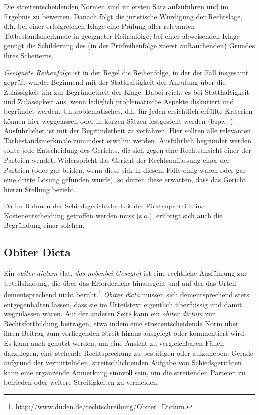 Die streitentscheidenden Normen sind im ersten Satz aufzuführen und im Ergebnis zu bewerten.%
Danach folgt die juristische Würdigung der Rechtslage, d.h. bei einer erfolgreichen Klage eine Prüfung aller relevanten Tatbestandsmerkmale in geeigneter Reihenfolge; bei einer abweisenden Klage genügt die Schilderung des (in der Prüfreihenfolge zuerst auftauchenden) Grundes ihres Scheiterns.

\emph{Geeignete Reihenfolge} ist in der Regel die Reihenfolge, in der der Fall insgesamt geprüft wurde:
Beginnend mit der Statthaftigkeit der Anrufung über die Zulässigkeit hin zur Begründetheit der Klage.
Dabei reicht es bei Statthaftigkeit und Zulässigkeit aus, wenn lediglich problematische Aspekte diskutiert und begründet werden.
Unproblematisches, d.h. für jeden ersichtlich erfüllte Kriterien können hier weggelassen oder in kurzen Sätzen festgestellt werden (bspw. ).
Ausführlicher ist mit der Begründetheit zu verfahren:
Hier sollten alle relevanten Tatbestandsmerkmale zumindest erwähnt werden.
Ausführlich begründet werden sollte jede Entscheidung des Gerichts, die sich gegen eine Rechtsansicht einer der Parteien wendet:
Widerspricht das Gericht der Rechtsauffassung einer der Parteien (oder gar beiden, wenn diese sich in diesem Falle einig waren oder gar eine dritte Lösung gefunden wurde), so dürfen diese erwarten, dass das Gericht hierzu Stellung bezieht.

Da im Rahmen der Schiedsgerichtsbarkeit der Piratenpartei keine Kostenentscheidung getroffen werden muss (s.o.), erübrigt sich auch die Begründung einer solchen.

\subsection{Obiter Dicta}
\label{Urteilsaufbau:ObiterDicta}
Ein \emph{obiter dictum} (lat. \emph{das nebenbei Gesagte}) ist eine rechtliche Ausführung zur Urteilsfindung, die über das Erforderliche hinausgeht und auf der das Urteil dementsprechend nicht beruht.\footnote{\url{http://www.duden.de/rechtschreibung/Obiter_Dictum}.}
\emph{Obiter dicta} müssen sich dementsprechend stets entgegenhalten lassen, dass sie im Urteilstext eigentlich überflüssig und damit wegzulassen wären.
Auf der anderen Seite kann ein \emph{obiter dictum} zur Rechtsfortbildung beitragen, etwa indem eine streitentscheidende Norm über ihren Beitrag zum vorliegenden Streit hinaus ausgelegt oder kommentiert wird.
Es kann auch genutzt werden, um eine Ansicht zu vergleichbaren Fällen darzulegen, eine stehende Rechtsprechung zu bestätigen oder aufzuheben.
Gerade aufgrund der vermittelnden, streitschlichtenden Aufgabe von Schiedsgerichten kann eine ergänzende Anmerkung sinnvoll sein, um die streitenden Parteien zu befrieden oder weitere Streitigkeiten  zu vermeiden.

